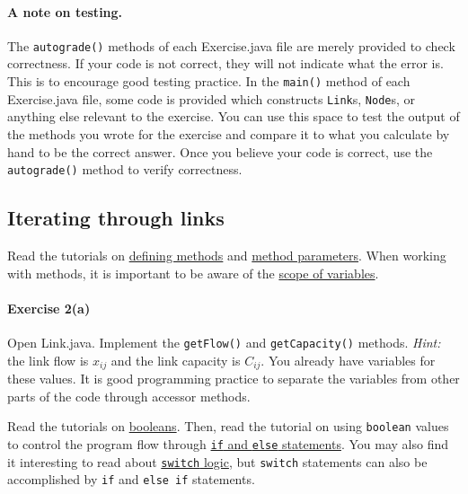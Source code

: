 \documentclass[12pt]{article}
\begin{document}
	
	\paragraph*{A note on testing.} The \texttt{autograde()} methods of each Exercise.java file are merely provided to check correctness. If your code is not correct, they will not indicate what the error is. This is to encourage good testing practice. In the \texttt{main()} method of each Exercise.java file, some code is provided which constructs \texttt{Link}s, \texttt{Node}s, or anything else relevant to the exercise. You can use this space to test the output of the methods you wrote for the exercise and compare it to what you calculate by hand to be the correct answer. Once you believe your code is correct, use the \texttt{autograde()} method to verify correctness.
	
	
	
\subsection{Iterating through links}
\label{sec22}	
	
Read the tutorials on \href{https://www.w3schools.com/java/java_methods.asp}{defining methods} and \href{https://www.w3schools.com/java/java_methods_param.asp}{method parameters}.  When working with methods, it is important to be aware of the \href{https://www.w3schools.com/java/java_scope.asp}{scope of variables}. 
	
\paragraph*{Exercise 2(a)} Open Link.java. Implement the \texttt{getFlow()} and \texttt{getCapacity()} methods. \textit{Hint:} the link flow is $x_{ij}$ and the link capacity is $C_{ij}$. You already have variables for these values. It is good programming practice to separate the variables from other parts of the code through accessor methods. 

\vspace{\baselineskip}

\noindent
Read the tutorials on \href{https://www.w3schools.com/java/java_booleans.asp}{booleans}. Then, read the tutorial on using \texttt{boolean} values to control the program flow through \href{https://www.w3schools.com/java/java_conditions.asp}{\texttt{if} and \texttt{else} statements}. You may also find it interesting to read about \href{https://www.w3schools.com/java/java_switch.asp}{\texttt{switch} logic}, but \texttt{switch} statements can also be accomplished by \texttt{if} and \texttt{else if} statements.
\end{document}
